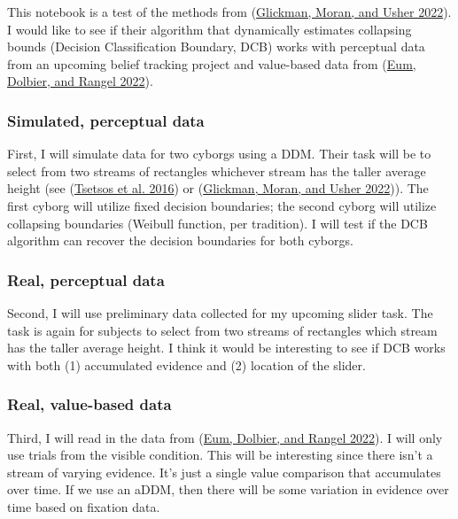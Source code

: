 \documentclass[
]{book}
\begin{document}
This notebook is a test of the methods from (\protect\hyperlink{ref-glickman2022}{Glickman, Moran, and Usher 2022}). I would like to see if their algorithm that dynamically estimates collapsing bounds (Decision Classification Boundary, DCB) works with perceptual data from an upcoming belief tracking project and value-based data from (\protect\hyperlink{ref-eum2022}{Eum, Dolbier, and Rangel 2022}).

\hypertarget{simulated-perceptual-data}{%
\subsubsection*{Simulated, perceptual data}\label{simulated-perceptual-data}}

First, I will simulate data for two cyborgs using a DDM. Their task will be to select from two streams of rectangles whichever stream has the taller average height (see (\protect\hyperlink{ref-tsetsos2016}{Tsetsos et al. 2016}) or (\protect\hyperlink{ref-glickman2022}{Glickman, Moran, and Usher 2022})). The first cyborg will utilize fixed decision boundaries; the second cyborg will utilize collapsing boundaries (Weibull function, per tradition). I will test if the DCB algorithm can recover the decision boundaries for both cyborgs.

\hypertarget{real-perceptual-data}{%
\subsubsection*{Real, perceptual data}\label{real-perceptual-data}}

Second, I will use preliminary data collected for my upcoming slider task. The task is again for subjects to select from two streams of rectangles which stream has the taller average height. I think it would be interesting to see if DCB works with both (1) accumulated evidence and (2) location of the slider.

\hypertarget{real-value-based-data}{%
\subsubsection*{Real, value-based data}\label{real-value-based-data}}

Third, I will read in the data from (\protect\hyperlink{ref-eum2022}{Eum, Dolbier, and Rangel 2022}). I will only use trials from the visible condition. This will be interesting since there isn't a stream of varying evidence. It's just a single value comparison that accumulates over time. If we use an aDDM, then there will be some variation in evidence over time based on fixation data.
\end{document}
